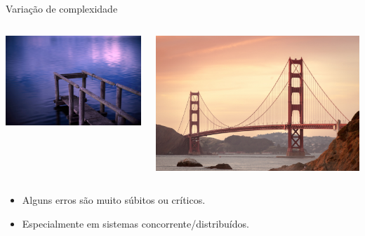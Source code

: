 \begin{frame}{Variação de complexidade}\small

  \begin{columns}
    \begin{column}{.5\textwidth}
      \begin{center}
        \includegraphics[scale=0.2]{simplebridge.png}
      \end{center}
    \end{column}

    \begin{column}{.5\textwidth}
      \begin{center}
        \includegraphics[scale=0.15]{complexbridge.png}        
      \end{center}
    \end{column}
  \end{columns}

  \begin{itemize}
  \item<2-> Alguns erros são muito súbitos ou críticos.
  \item<3-> Especialmente em sistemas concorrente/distribuídos.
  \end{itemize}
  
\end{frame}

